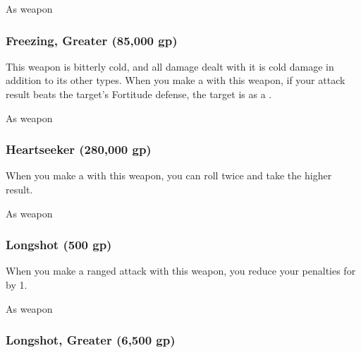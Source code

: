  


 As weapon


\lowercase{\hypertarget{item:Freezing, Greater}{}}\label{item:Freezing, Greater}
\hypertarget{item:Freezing, Greater}{\subsubsection{Freezing, Greater\hfill{} (85,000 gp)}}

This weapon is bitterly cold, and all damage dealt with it is cold damage in addition to its other types.
When you make a  with this weapon, if your attack result beats the target's Fortitude defense, the target is \fatigued as a .



 


 As weapon


\lowercase{\hypertarget{item:Heartseeker}{}}\label{item:Heartseeker}
\hypertarget{item:Heartseeker}{\subsubsection{Heartseeker\hfill{} (280,000 gp)}}

When you make a  with this weapon, you can roll twice and take the higher result.



 


 As weapon


\lowercase{\hypertarget{item:Longshot}{}}\label{item:Longshot}
\hypertarget{item:Longshot}{\subsubsection{Longshot\hfill{} (500 gp)}}

When you make a ranged attack with this weapon, you reduce your penalties for  by 1.



 As weapon


\lowercase{\hypertarget{item:Longshot, Greater}{}}\label{item:Longshot, Greater}
\hypertarget{item:Longshot, Greater}{\subsubsection{Longshot, Greater\hfill{} (6,500 gp)}}

